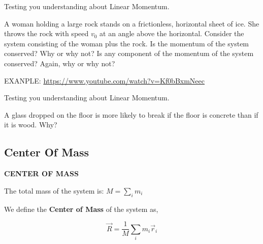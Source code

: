 \documentclass[]{beamer}
\begin{document}
\begin{frame}

    Testing you understanding about Linear Momentum.
    \vspace{7mm}
    
 
    A woman holding a large rock stands on a frictionless, horizontal
sheet of ice. She throws the rock with speed $v_0$ at an angle
above the horizontal. Consider the system consisting of the woman
plus the rock. Is the momentum of the system conserved? Why or
why not? Is any component of the momentum of the system conserved?
Again, why or why not?
    
\vspace{7mm}

EXANPLE: \url{https://www.youtube.com/watch?v=Kf0bBxmNeec}
     \end{frame}



\begin{frame}

    Testing you understanding about Linear Momentum.
    \vspace{7mm}
    
 
    A glass dropped on the floor is more likely to break if the
    floor is concrete than if it is wood. Why?
    
     \end{frame}









\subsection{Center Of Mass}
\begin{frame}
   \textbf{CENTER OF MASS}
    \vspace{7mm}
    
    The total mass of the system is: $M=\sum_i m_i$
    \vspace{5mm}
  
    We define the \textbf{Center of Mass} of the system as,
  
    \begin{equation}
      \vec{R}=\frac{1}{M}\sum_i m_i \vec{r}_i
      \label{CM}
    \end{equation}
    
    
    \end{frame}
\end{document}

